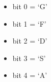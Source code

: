 \begin{itemize}
\item[] bit 0 = ‘G’
\item[] bit 1 = ‘F’
\item[] bit 2 = ‘D’
\item[] bit 3 = ‘S’
\item[] bit 4 = ‘A’
\end{itemize}

